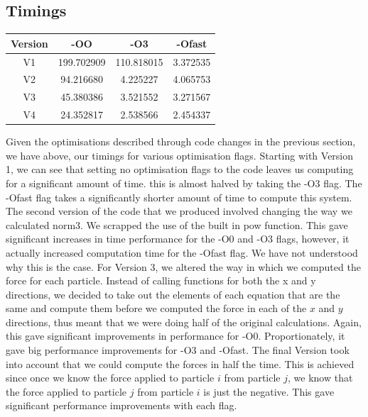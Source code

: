 \documentclass{article}
\begin{document}
\subsection{Timings}
\begin{center}
\begin{tabular}{|c|c|c|c|}
\hline
Version & -OO & -O3 & -Ofast\\
\hline
V1 & 199.702909 & 110.818015 & 3.372535\\
V2 & 94.216680 & 4.225227 & 4.065753\\
V3 & 45.380386 & 3.521552 & 3.271567\\
V4 & 24.352817 & 2.538566 & 2.454337\\
\hline
\end{tabular}
\end{center}
Given the optimisations described through code changes in the previous section, we have above, our timings for various optimisation flags.
\vspace{0.3cm}
Starting with Version 1, we can see that setting no optimisation flags to the code leaves us computing for a significant amount of time. this is almost halved by taking the -O3 flag. The -Ofast flag takes a significantly shorter amount of time to compute this system.
\vspace{0.3cm}
The second version of the code that we produced involved changing the way we calculated norm3. We scrapped the use of the built in pow function. This gave significant increases in time performance for the -O0 and -O3 flags, however, it actually increased computation time for the -Ofast flag. We have not understood why this is the case.
\vspace{0.3cm}
For Version 3, we altered the way in which we computed the force for each particle. Instead of calling functions for both the x and y directions, we decided to take out the elements of each equation that are the same and compute them before we computed the force in each of the $x$ and $y$ directions, thus meant that we were doing half of the original calculations. Again, this gave significant improvements in performance for -O0. Proportionately, it gave big performance improvements for -O3 and -Ofast.
\vspace{0.3cm}
The final Version took into account that we could compute the forces in half the time. This is achieved since once we know the force applied to particle $i$ from particle $j$, we know that the force applied to particle $j$ from particle $i$ is just the negative. This gave significant performance improvements with each flag.
\end{document}
